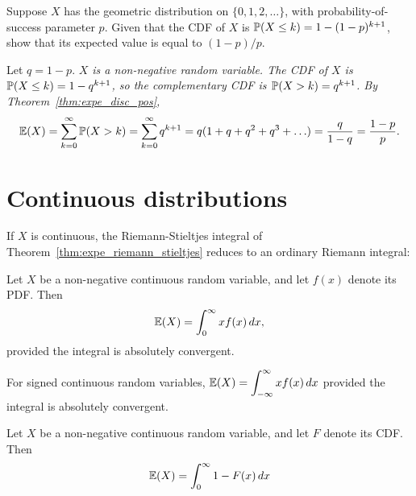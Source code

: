 \begin{example}
Suppose $X$ has the geometric distribution on $\{0,1,2,\ldots\}$, with probability-of-success parameter $p$. Given that the CDF of $X$ is $\mathbb{P}(X\leq k) = 1 - (1-p)^{k+1}$, show that its expected value is equal to $(1-p)/p$.
\end{example}
\begin{solution}
Let $q=1-p$. 
\bit
\it $X$ is a non-negative random variable.
\it The CDF of $X$ is $\mathbb{P}(X\leq k) = 1 - q^{k+1}$, so the complementary CDF is $\mathbb{P}(X>k) = q^{k+1}$.
\eit
By Theorem~\ref{thm:expe_disc_pos},
\[
\mathbb{E}(X) 
	= \sum_{k=0}^\infty \mathbb{P}(X > k)
	= \sum_{k=0}^\infty q^{k+1}
	= q(1 + q + q^2 + q^3 + \ldots)
	= \frac{q}{1-q} = \frac{1-p}{p}.
\]
\end{solution}

\newpage
\section{Continuous distributions}
If $X$ is continuous, the Riemann-Stieltjes integral of Theorem~\ref{thm:expe_riemann_stieltjes} reduces to an ordinary Riemann integral:

\begin{theorem}\label{thm:expe_wrt_discrete_dist}
Let $X$ be a non-negative continuous random variable, and let $f(x)$ denote its PDF. Then
\[
\expe(X) = \int_{0}^{\infty} x f(x)\,dx, %
\]
provided the integral is absolutely convergent.
\end{theorem}
\proofomitted
\begin{remark}
For signed continuous random variables, $\mathbb{E}(X) = \displaystyle\int_{-\infty}^{\infty} x f(x)\,dx$ provided the integral is absolutely convergent. 
\end{remark}

\begin{theorem}\label{thm:expe_cts_pos}
Let $X$ be a non-negative continuous random variable, and let $F$ denote its CDF. Then
\[
\mathbb{E}(X) = \int_0^\infty 1 - F(x) \,dx
\]
\end{theorem}
\proofomitted


